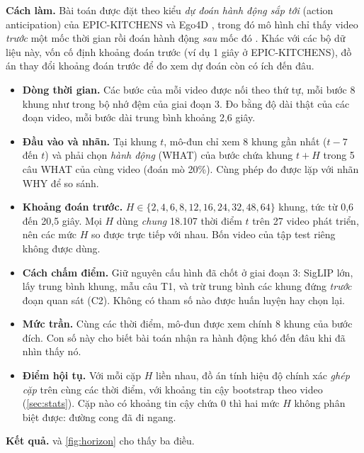 \documentclass[a4paper,oneside]{report}
\begin{document}
\textbf{Cách làm.} Bài toán được đặt theo kiểu \textit{dự đoán hành động sắp tới} (action anticipation) của EPIC-KITCHENS \citep{damen2018epic} và Ego4D \citep{grauman2022ego4d}, trong đó mô hình chỉ thấy video \textit{trước} một mốc thời gian rồi đoán hành động \textit{sau} mốc đó \citep{furnari2021rulstm}. Khác với các bộ dữ liệu này, vốn cố định khoảng đoán trước (ví dụ 1 giây ở EPIC-KITCHENS), đồ án thay đổi khoảng đoán trước để đo xem dự đoán còn có ích đến đâu.
\begin{itemize}
  \item \textbf{Dòng thời gian.} Các bước của mỗi video được nối theo thứ tự, mỗi bước 8 khung như trong bộ nhớ đệm của giai đoạn 3. Đo bằng độ dài thật của các đoạn video, mỗi bước dài trung bình khoảng 2,6 giây.
  \item \textbf{Đầu vào và nhãn.} Tại khung $t$, mô-đun chỉ xem 8 khung gần nhất ($t-7$ đến $t$) và phải chọn \textit{hành động} (WHAT) của bước chứa khung $t+H$ trong 5 câu WHAT của cùng video (đoán mò 20\%). Cùng phép đo được lặp với nhãn WHY để so sánh.
  \item \textbf{Khoảng đoán trước.} $H\in\{2,4,6,8,12,16,24,32,48,64\}$ khung, tức từ 0,6 đến 20,5 giây. Mọi $H$ dùng \textit{chung} 18.107 thời điểm $t$ trên 27 video phát triển, nên các mức $H$ so được trực tiếp với nhau. Bốn video của tập test riêng không được dùng.
  \item \textbf{Cách chấm điểm.} Giữ nguyên cấu hình đã chốt ở giai đoạn 3: SigLIP lớn, lấy trung bình khung, mẫu câu T1, và trừ trung bình các khung đứng \textit{trước} đoạn quan sát (C2). Không có tham số nào được huấn luyện hay chọn lại.
  \item \textbf{Mức trần.} Cùng các thời điểm, mô-đun được xem chính 8 khung của bước đích. Con số này cho biết bài toán nhận ra hành động khó đến đâu khi đã nhìn thấy nó.
  \item \textbf{Điểm hội tụ.} Với mỗi cặp $H$ liền nhau, đồ án tính hiệu độ chính xác \textit{ghép cặp} trên cùng các thời điểm, với khoảng tin cậy bootstrap theo video (\cref{sec:stats}). Cặp nào có khoảng tin cậy chứa 0 thì hai mức $H$ không phân biệt được: đường cong đã đi ngang.
\end{itemize}

\textbf{Kết quả.}  và \cref{fig:horizon} cho thấy ba điều.
\end{document}
